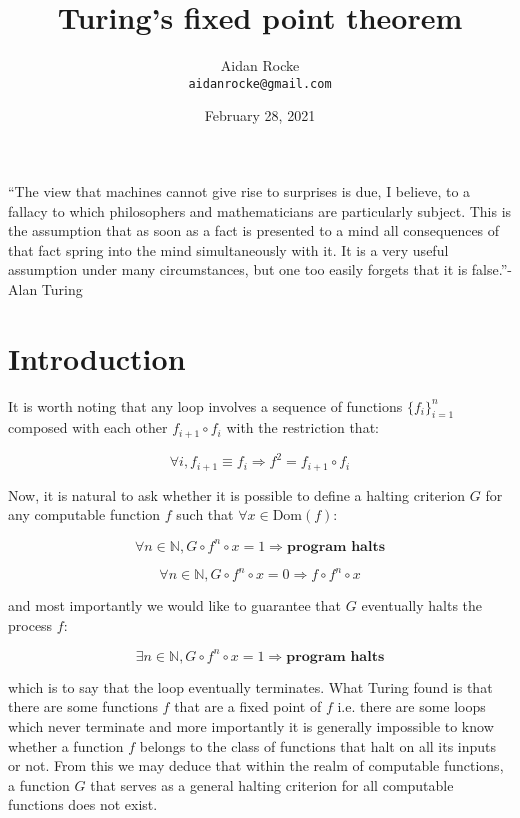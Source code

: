 \documentclass{article}
\title{Turing's fixed point theorem}
\date{February 28, 2021}
\author{%
  Aidan Rocke\\
  \texttt{aidanrocke@gmail.com} \\
}
\begin{document}

\maketitle

\enquote{The view that machines cannot give rise to surprises is due, I believe, to a fallacy to which philosophers and mathematicians are particularly subject. This is the assumption that as soon as a fact is presented to a mind all consequences of that fact spring into the mind simultaneously with it. It is a very useful assumption under many circumstances, but one too easily forgets that it is false.}-Alan Turing

\section{Introduction}

It is worth noting that any loop involves a sequence of functions $\{f_i\}_{i=1}^n$ composed
with each other $f_{i+1} \circ f_i$ with the restriction that:

\begin{equation}
\forall i, f_{i+1} \equiv f_i \Rightarrow f^2 = f_{i+1} \circ f_i
\end{equation}

Now, it is natural to ask whether it is possible to define a halting criterion $G$ for any
computable function $f$ such that $\forall x \in \text{Dom}(f)$:

\begin{equation}
\forall n \in \mathbb{N}, G \circ f^n \circ x = 1 \Rightarrow \textbf{program halts}
\end{equation}

\begin{equation}
\forall n \in \mathbb{N}, G \circ f^n \circ x = 0 \Rightarrow f \circ f^n \circ x
\end{equation}

and most importantly we would like to guarantee that $G$ eventually halts the process $f$:

\begin{equation}
\exists n \in \mathbb{N}, G \circ f^n \circ x = 1 \Rightarrow \textbf{program halts}
\end{equation}

which is to say that the loop eventually terminates. What Turing found is that there are some functions
$f$ that are a fixed point of $f$ i.e. there are some loops which never terminate and more importantly
it is generally impossible to know whether a function $f$ belongs to the class of functions that halt on all its inputs
or not. From this we may deduce that within the realm of computable functions, a function $G$ that serves as
a general halting criterion for all computable functions does not exist.
\end{document}
